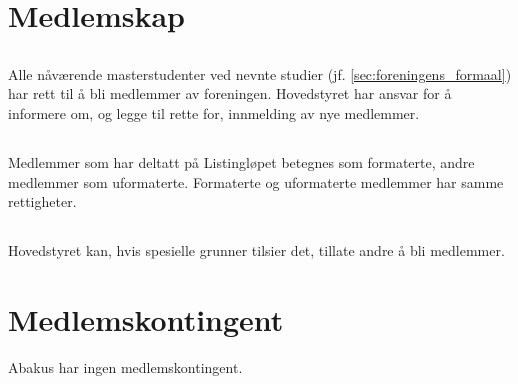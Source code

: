 \section{Medlemskap}

\subsection{}
Alle nåværende masterstudenter ved nevnte studier (jf. \ref{sec:foreningens_formaal})  har rett til å bli medlemmer av foreningen. 
Hovedstyret har ansvar for å informere om, og legge til rette for, innmelding av nye medlemmer.

\subsection{}
Medlemmer som har deltatt på Listingløpet betegnes som formaterte, andre
medlemmer som uformaterte. Formaterte og uformaterte medlemmer har samme
rettigheter.

\subsection{}
Hovedstyret kan, hvis spesielle grunner tilsier det, tillate andre å bli medlemmer. 

\section{Medlemskontingent}
Abakus har ingen medlemskontingent.
